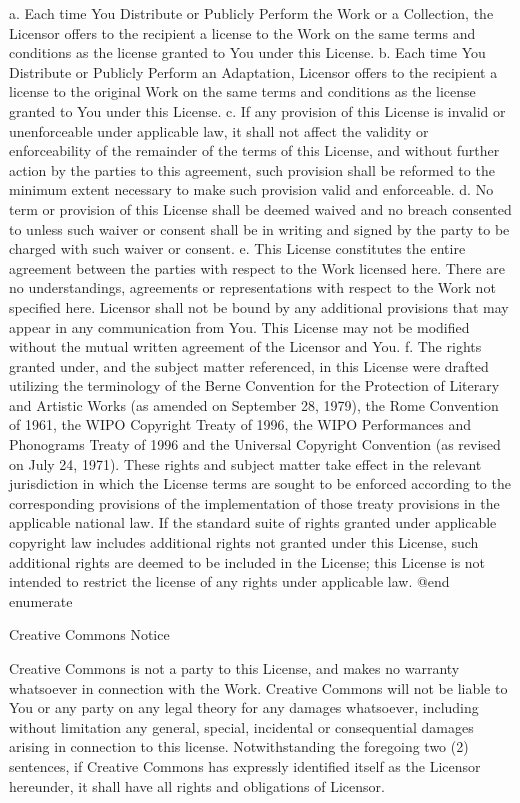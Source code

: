  a. Each time You Distribute or Publicly Perform the Work or a Collection,
    the Licensor offers to the recipient a license to the Work on the same
    terms and conditions as the license granted to You under this License.
 b. Each time You Distribute or Publicly Perform an Adaptation, Licensor
    offers to the recipient a license to the original Work on the same
    terms and conditions as the license granted to You under this License.
 c. If any provision of this License is invalid or unenforceable under
    applicable law, it shall not affect the validity or enforceability of
    the remainder of the terms of this License, and without further action
    by the parties to this agreement, such provision shall be reformed to
    the minimum extent necessary to make such provision valid and
    enforceable.
 d. No term or provision of this License shall be deemed waived and no
    breach consented to unless such waiver or consent shall be in writing
    and signed by the party to be charged with such waiver or consent.
 e. This License constitutes the entire agreement between the parties with
    respect to the Work licensed here. There are no understandings,
    agreements or representations with respect to the Work not specified
    here. Licensor shall not be bound by any additional provisions that
    may appear in any communication from You. This License may not be
    modified without the mutual written agreement of the Licensor and You.
 f. The rights granted under, and the subject matter referenced, in this
    License were drafted utilizing the terminology of the Berne Convention
    for the Protection of Literary and Artistic Works (as amended on
    September 28, 1979), the Rome Convention of 1961, the WIPO Copyright
    Treaty of 1996, the WIPO Performances and Phonograms Treaty of 1996
    and the Universal Copyright Convention (as revised on July 24, 1971).
    These rights and subject matter take effect in the relevant
    jurisdiction in which the License terms are sought to be enforced
    according to the corresponding provisions of the implementation of
    those treaty provisions in the applicable national law. If the
    standard suite of rights granted under applicable copyright law
    includes additional rights not granted under this License, such
    additional rights are deemed to be included in the License; this
    License is not intended to restrict the license of any rights under
    applicable law.
@end enumerate


Creative Commons Notice

    Creative Commons is not a party to this License, and makes no warranty
    whatsoever in connection with the Work. Creative Commons will not be
    liable to You or any party on any legal theory for any damages
    whatsoever, including without limitation any general, special,
    incidental or consequential damages arising in connection to this
    license. Notwithstanding the foregoing two (2) sentences, if Creative
    Commons has expressly identified itself as the Licensor hereunder, it
    shall have all rights and obligations of Licensor.


